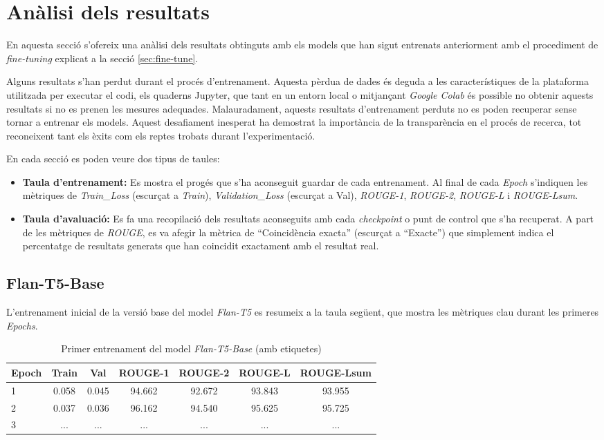 \section{Anàlisi dels resultats}
En aquesta secció s'ofereix una anàlisi dels resultats obtinguts amb els models que han sigut entrenats anteriorment amb el procediment de \textit{fine-tuning} explicat a la secció \ref{sec:fine-tune}.

Alguns resultats s'han perdut durant el procés d'entrenament. Aquesta pèrdua de dades és deguda a les característiques de la plataforma utilitzada per executar el codi, els quaderns Jupyter, que tant en un entorn local o mitjançant \textit{Google Colab} és possible no obtenir aquests resultats si no es prenen les mesures adequades. Malauradament, aquests resultats d'entrenament perduts no es poden recuperar sense tornar a entrenar els models. Aquest desafiament inesperat ha demostrat la importància de la transparència en el procés de recerca, tot reconeixent tant els èxits com els reptes trobats durant l'experimentació.

En cada secció es poden veure dos tipus de taules:
\begin{itemize}
    \item \textbf{Taula d'entrenament:} Es mostra el progés que s'ha aconseguit guardar de cada entrenament. Al final de cada \textit{Epoch} s'indiquen les mètriques de \textit{Train\_Loss} (escurçat a \textit{Train}), \textit{Validation\_Loss} (escurçat a Val), \textit{ROUGE-1}, \textit{ROUGE-2}, \textit{ROUGE-L} i \textit{ROUGE-Lsum}.
    \item \textbf{Taula d'avaluació:} Es fa una recopilació dels resultats aconseguits amb cada \textit{checkpoint} o punt de control que s'ha recuperat. A part de les mètriques de \textit{ROUGE}, es va afegir la mètrica de ``Coincidència exacta'' (escurçat a ``Exacte'') que simplement indica el percentatge de resultats generats que han coincidit exactament amb el resultat real.
\end{itemize}

\subsection{Flan-T5-Base}
L'entrenament inicial de la versió base del model \textit{Flan-T5} es resumeix a la taula següent, que mostra les mètriques clau durant les primeres \textit{Epochs}. 

\begin{table}[H]
    \centering
    \begin{tabular}{lcccccc}
    \toprule
    Epoch & Train & Val & ROUGE-1 & ROUGE-2 & ROUGE-L & ROUGE-Lsum \\
    \midrule
    1 & 0.058 & 0.045 & 94.662 & 92.672 & 93.843 & 93.955 \\
    2 & 0.037 & 0.036 & 96.162 & 94.540 & 95.625 & 95.725 \\
    3 & ... & ... & ... & ... & ... & ... \\
    \bottomrule
    \end{tabular}
    \caption[Primer entrenament del model \textit{Flan-T5-Base}]{Primer entrenament del model \textit{Flan-T5-Base} (amb etiquetes)}
\end{table}


